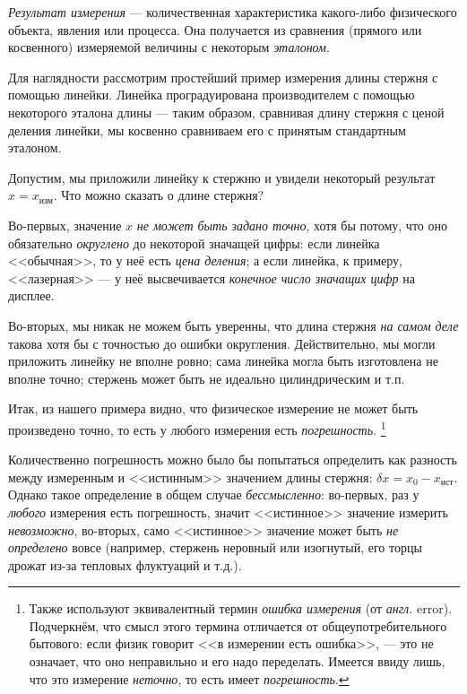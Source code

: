 \documentclass[10pt]{article}
\begin{document}
\emph{Результат измерения} --- количественная характеристика
какого-либо физического объекта, явления или процесса. Она получается
из сравнения (прямого или косвенного) измеряемой величины с некоторым
\emph{эталоном}.

Для наглядности рассмотрим простейший пример измерения длины стержня
с помощью линейки. Линейка проградуирована производителем с помощью
некоторого эталона длины --- таким образом, сравнивая длину
стержня с ценой деления линейки, мы косвенно сравниваем его с принятым
стандартным эталоном. 

Допустим, мы приложили линейку к стержню и увидели некоторый результат
$x=x_{\text{изм}}$. Что можно сказать о длине стержня?

Во-первых, значение $x$ \emph{не может быть задано точно}, хотя бы
потому, что оно обязательно \emph{округлено} до некоторой значащей
цифры: если линейка <<обычная>>, то у неё
есть \emph{цена деления}; а если линейка, к примеру, <<лазерная>>
--- у неё высвечивается \emph{конечное число значащих цифр}
на дисплее.

Во-вторых, мы никак не можем быть уверенны, что длина стержня \emph{на
самом деле} такова хотя бы с точностью до ошибки округления. Действительно,
мы могли приложить линейку не вполне ровно; сама линейка могла быть
изготовлена не вполне точно; стержень может быть не идеально цилиндрическим
и т.п.

Итак, из нашего примера видно, что физическое измерение не может быть
произведено точно, то есть у любого измерения есть \emph{погрешность}.
\footnote{Также используют эквивалентный термин \emph{ошибка измерения} (от\emph{
англ.} error). Подчеркнём, что смысл этого термина отличается от общеупотребительного
бытового: если физик говорит <<в измерении есть ошибка>>,
--- это не означает, что оно неправильно и его надо переделать.\emph{
}Имеется ввиду лишь, что это измерение \emph{неточно}, то есть имеет
\emph{погрешность}. } 

{\footnotesize{}Количественно погрешность можно было бы попытаться
определить как разность между измеренным и <<истинным>>
значением длины стержня: $\delta x=x_{0}-x_{\text{ист}}$. Однако
такое определение в общем случае }\emph{\footnotesize{}бессмысленно}{\footnotesize{}:
во-первых, раз у }\emph{\footnotesize{}любого}{\footnotesize{} измерения
есть погрешность, значит <<истинное>> значение
измерить }\emph{\footnotesize{}невозможно}{\footnotesize{}, во-вторых,
само <<истинное>> значение может быть }\emph{\footnotesize{}не
определено}{\footnotesize{} вовсе (например, стержень неровный или
изогнутый, его торцы дрожат из-за тепловых флуктуаций и т.д.).}{\footnotesize\par}
\end{document}
